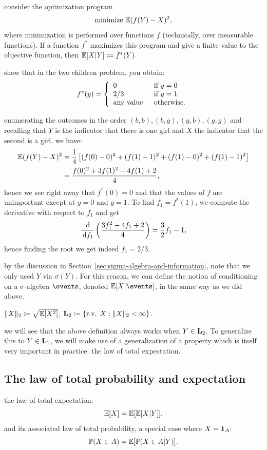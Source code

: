 \documentclass{article}
\begin{document}
 consider the optimization program
\[ \text{minimize}\ {\mathbb E}(f(Y) - X)^2, \]
where minimization is performed over functions $f$ (technically, over measurable functions). If a function $f^*$ maximizes this program and give a finite value to the objective function, then ${\mathbb E}[X|Y] \coloneqq f^*(Y)$.

 show that in the two children problem, you obtain:
\[ f^*(y) = \left\{ \begin{array}{ll} 0 \;\;&\text{if }y=0\\ 2/3\;\;&\text{if }y=1\\\text{any value}\;\;&\text{otherwise.} \end{array} \right. \] 

 enumerating the outcomes in the order $(b, b), (b, g), (g, b), (g, g)$ and recalling that $Y$ is the indicator that there is one girl and $X$ the indicator that the second is a girl, we have:
\begin{align*} {\mathbb E}(f(Y) - X)^2 &= \frac{1}{4}\left[ (f(0) - 0)^2 + (f(1) - 1)^2 + (f(1) - 0)^2 + (f(1) - 1)^2 \right] \\ 
&= \frac{f(0)^2 + 3 f(1)^2 - 4f(1) +2}{4},
\end{align*}
hence we see right away that $f^*(0) = 0$ and that the values of $f$ are unimportant except at $y=0$ and $y=1$. To find $f_1 = f^*(1)$, we compute the derivative with respect to $f_1$ and get
\[ \frac{\,\mathrm{d}}{\,\mathrm{d} f_1} \left(  \frac{3 f_1^2 - 4 f_1 +2}{4}\right) = \frac{3}{2} f_1 - 1, \]
hence finding the root we get indeed $f_1 = 2/3$.

 by the discussion in Section~\ref{sec:sigma-algebra-and-information}, note that we only used $Y$ via $\sigma(Y)$. For this reason, we can define the notion of conditioning on a $\sigma$-algebra $\events$, denoted $\E[X|\events]$, in the same way as we did above.

 $\|X\|_2 \coloneqq \sqrt{{\mathbb E}[X^2]}$, $\mathbf L_2 \coloneqq \{\text{r.v. } X : \|X\|_2 < \infty\}$.

 we will see that the above definition always works when $Y \in \mathbf L_2$. To generalize this to $Y \in \mathbf L_1$, we will make use of a generalization of a property which is itself very important in practice: the law of total expectation.


\subsection{The law of total probability and expectation}\label{sec:law-total-pr}

 the law of total expectation:
\[ {\mathbb E}[X] = {\mathbb E}[{\mathbb E}[X|Y]], \]
and its associated law of total probability, a special case where $X = {\mathbf 1}_A$:
\[ {\mathbb P}(X \in A) = {\mathbb E}[ {\mathbb P}(X \in A|Y) ]. \]
\end{document}
